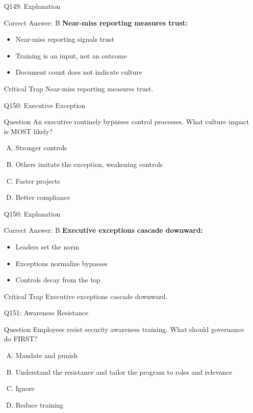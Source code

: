 \documentclass{beamer}
\begin{document}
	\begin{frame}{Q149: Explanation}
		\begin{block}{Correct Answer: B}
			\textbf{Near-miss reporting measures trust:}
			\begin{itemize}
				\item Near-miss reporting signals trust
				\item Training is an input, not an outcome
				\item Document count does not indicate culture
			\end{itemize}
		\end{block}
		\begin{alertblock}{Critical Trap}
			Near-miss reporting measures trust.
		\end{alertblock}
	\end{frame}
	
	\begin{frame}{Q150: Executive Exception}
		\begin{block}{Question}
			An executive routinely bypasses control processes. What culture impact is MOST likely?
		\end{block}
		\begin{enumerate}[(A)]
			\item Stronger controls
			\item Others imitate the exception, weakening controls
			\item Faster projects
			\item Better compliance
		\end{enumerate}
	\end{frame}
	
	\begin{frame}{Q150: Explanation}
		\begin{block}{Correct Answer: B}
			\textbf{Executive exceptions cascade downward:}
			\begin{itemize}
				\item Leaders set the norm
				\item Exceptions normalize bypasses
				\item Controls decay from the top
			\end{itemize}
		\end{block}
		\begin{alertblock}{Critical Trap}
			Executive exceptions cascade downward.
		\end{alertblock}
	\end{frame}
	
	\begin{frame}{Q151: Awareness Resistance}
		\begin{block}{Question}
			Employees resist security awareness training. What should governance do FIRST?
		\end{block}
		\begin{enumerate}[(A)]
			\item Mandate and punish
			\item Understand the resistance and tailor the program to roles and relevance
			\item Ignore
			\item Reduce training
		\end{enumerate}
	\end{frame}
	
\end{document}
